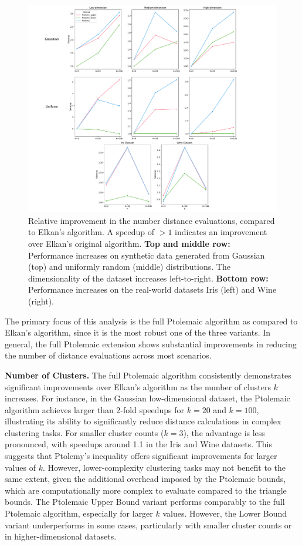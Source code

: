 \begin{figure}[h]
	\centering
	\includegraphics[width=\textwidth]{fig/combined_plot.pdf}
	\caption{
		Relative improvement in the number distance evaluations, compared to Elkan's algorithm.
        A speedup of $>1$ indicates an improvement over Elkan's original algorithm.
		\textbf{Top and middle row:} Performance increases on synthetic data generated from Gaussian (top) and uniformly random (middle) distributions.
		The dimensionality of the dataset increases left-to-right.
		\textbf{Bottom row:} Performance increases on the real-world datasets Iris (left) and Wine (right).
	}
	\label{fig:combined}
\end{figure}


The primary focus of this analysis is the full Ptolemaic algorithm as compared to Elkan's algorithm, since it is the most robust one of the three variants. 
In general, the full Ptolemaic extension shows substantial improvements in reducing the number of distance evaluations across most scenarios.

\textbf{Number of Clusters.}
The full Ptolemaic algorithm consistently demonstrates significant improvements over Elkan’s algorithm as the number of clusters $k$ increases.
For instance, in the Gaussian low-dimensional dataset, the Ptolemaic algorithm achieves larger than 2-fold speedups for $k = 20$ and $k = 100$, illustrating its ability to significantly reduce distance calculations in complex clustering tasks.
For smaller cluster counts ($k = 3$), the advantage is less pronounced, with speedups around 1.1 in the Iris and Wine datasets.
This suggests that Ptolemy's inequality offers significant improvements for larger values of $k$.
However, lower-complexity clustering tasks may not benefit to the same extent,
given the additional overhead imposed by the Ptolemaic bounds, which are computationally more complex to evaluate compared to the triangle bounds.
The Ptolemaic Upper Bound variant performs comparably to the full Ptolemaic algorithm, especially for larger $k$ values.
However, the Lower Bound variant underperforms in some cases, particularly with smaller cluster counts or in higher-dimensional datasets.

